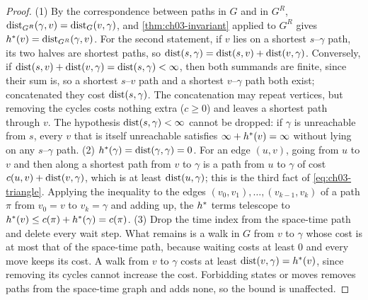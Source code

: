 \begin{proof}
(1) By the correspondence between paths in $G$ and in $G^{R}$, $\operatorname{dist}_{G^{R}}(\gamma,v)=\operatorname{dist}_G(v,\gamma)$,
and \cref{thm:ch03-invariant} applied to $G^{R}$ gives $h^*(v)=\operatorname{dist}_{G^{R}}(\gamma,v)$. For the
second statement, if $v$ lies on a shortest $s$--$\gamma$ path, its two halves are shortest paths,
so $\operatorname{dist}(s,\gamma)=\operatorname{dist}(s,v)+\operatorname{dist}(v,\gamma)$. Conversely, if $\operatorname{dist}(s,v)+\operatorname{dist}(v,\gamma)=\operatorname{dist}(s,\gamma)<\infty$, then both summands are finite,
since their sum is, so a shortest $s$--$v$ path and a shortest $v$--$\gamma$ path both exist;
concatenated they cost $\operatorname{dist}(s,\gamma)$. The concatenation may repeat vertices, but removing the
cycles costs nothing extra ($c\ge0$) and leaves a shortest path through $v$. The hypothesis
$\operatorname{dist}(s,\gamma)<\infty$ cannot be dropped: if $\gamma$ is unreachable from $s$, every $v$ that is itself
unreachable satisfies $\infty+h^*(v)=\infty$ without lying on any $s$--$\gamma$ path.
(2) $h^*(\gamma)=\operatorname{dist}(\gamma,\gamma)=0$. For an edge $(u,v)$, going from $u$ to $v$ and then along a
shortest path from $v$ to $\gamma$ is a path from $u$ to $\gamma$ of cost $c(u,v)+\operatorname{dist}(v,\gamma)$, which is at
least $\operatorname{dist}(u,\gamma)$; this is the third fact of \cref{eq:ch03-triangle}. Applying the inequality
to the edges $(v_0,v_1),\dots,(v_{k-1},v_k)$ of a path $\pi$ from $v_0=v$ to $v_k=\gamma$ and adding
up, the $h^*$ terms telescope to $h^*(v)\le c(\pi)+h^*(\gamma)=c(\pi)$.
(3) Drop the time index from the space-time path and delete every wait step. What remains is a
walk in $G$ from $v$ to $\gamma$ whose cost is at most that of the space-time path, because waiting
costs at least 0 and every move keeps its cost. A walk from $v$ to $\gamma$ costs at least
$\operatorname{dist}(v,\gamma)=h^*(v)$, since removing its cycles cannot increase the cost. Forbidding states
or moves removes paths from the space-time graph and adds none, so the bound is unaffected.
\end{proof}

